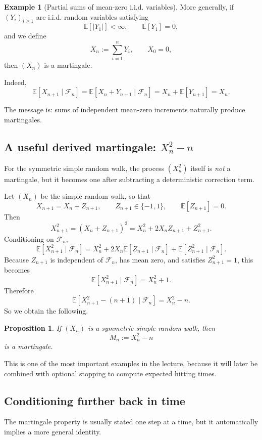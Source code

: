 \documentclass[11pt]{article}
\newtheorem{proposition}[theorem]{Proposition}
\theoremstyle{definition}
\newtheorem{example}[theorem]{Example}
\begin{document}
\begin{example}[Partial sums of mean-zero i.i.d. variables]
More generally, if \((Y_i)_{i\ge 1}\) are i.i.d. random variables satisfying
\[
\mathbb E[|Y_1|]<\infty,
\qquad
\mathbb E[Y_1]=0,
\]
and we define
\[
X_n:=\sum_{i=1}^n Y_i,
\qquad X_0=0,
\]
then \((X_n)\) is a martingale.

Indeed,
\[
\mathbb E[X_{n+1}\mid \mathcal F_n]
=
\mathbb E[X_n+Y_{n+1}\mid \mathcal F_n]
=
X_n+\mathbb E[Y_{n+1}]
=
X_n.
\]
\end{example}

The message is: sums of independent mean-zero increments naturally produce martingales.

\subsection[A useful derived martingale: Xn2 - n]{A useful derived martingale: \texorpdfstring{$X_n^2-n$}{Xn2 - n}}

For the symmetric simple random walk, the process \((X_n^2)\) itself is \emph{not} a martingale, but it becomes one after subtracting a deterministic correction term.

Let \((X_n)\) be the simple random walk, so that
\[
X_{n+1}=X_n+Z_{n+1},
\qquad Z_{n+1}\in\{-1,1\},
\qquad \mathbb E[Z_{n+1}]=0.
\]
Then
\[
X_{n+1}^2=(X_n+Z_{n+1})^2=X_n^2+2X_nZ_{n+1}+Z_{n+1}^2.
\]
Conditioning on \(\mathcal F_n\),
\[
\mathbb E[X_{n+1}^2\mid \mathcal F_n]
=
X_n^2+2X_n\mathbb E[Z_{n+1}\mid \mathcal F_n]+\mathbb E[Z_{n+1}^2\mid \mathcal F_n].
\]
Because \(Z_{n+1}\) is independent of \(\mathcal F_n\), has mean zero, and satisfies \(Z_{n+1}^2=1\), this becomes
\[
\mathbb E[X_{n+1}^2\mid \mathcal F_n]=X_n^2+1.
\]
Therefore
\[
\mathbb E[X_{n+1}^2-(n+1)\mid \mathcal F_n]=X_n^2-n.
\]
So we obtain the following.

\begin{proposition}
If \((X_n)\) is a symmetric simple random walk, then
\[
M_n:=X_n^2-n
\]
is a martingale.
\end{proposition}

This is one of the most important examples in the lecture, because it will later be combined with optional stopping to compute expected hitting times.

\subsection{Conditioning further back in time}

The martingale property is usually stated one step at a time, but it automatically implies a more general identity.
\end{document}
